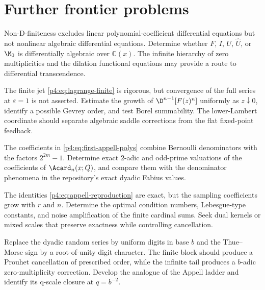 \documentclass[11pt]{article}
\numberwithin{equation}{section}
\theoremstyle{definition}
\theoremstyle{remark}
\newcommand{\C}{\mathbb C}
\begin{document}
\section{Further frontier problems}
\label{p4:sec:open}

\begin{frontieropenbox}[title=1. Differential transcendence]
Non-D-finiteness excludes linear polynomial-coefficient differential equations but not nonlinear algebraic differential equations.  Determine whether $F$, $I$, $U$, $\widehat U$, or $\M_0$ is differentially algebraic over $\C(x)$.  The infinite hierarchy of zero multiplicities and the dilation functional equations may provide a route to differential transcendence.
\end{frontieropenbox}

\begin{frontieropenbox}[title=2. Convergence and resurgence of the inverse Lagrange--Bell coupling series]
The finite jet \eqref{p4:eq:lagrange-finite} is rigorous, but convergence of the full series at $\varepsilon=1$ is not asserted.  Estimate the growth of
$\D^{n-1}[F(z)^n]$ uniformly as $z\downarrow0$, identify a possible Gevrey order, and test Borel summability.  The lower-Lambert coordinate should separate algebraic saddle corrections from the flat fixed-point feedback.
\end{frontieropenbox}

\begin{frontieropenbox}[title=3. Exact two-adic denominator laws for the cardinal Appell family]
The coefficients in \eqref{p4:eq:first-appell-polys} combine Bernoulli denominators with the factors $2^{2m}-1$.  Determine exact $2$-adic and odd-prime valuations of the coefficients of $\Acard_n(x;Q)$, and compare them with the denominator phenomena in the repository's exact dyadic Fabius values.
\end{frontieropenbox}

\begin{frontieropenbox}[title=4. Stability of coarsening reproduction]
The identities \eqref{p4:eq:appell-reproduction} are exact, but the sampling coefficients grow with $r$ and $n$.  Determine the optimal condition numbers, Lebesgue-type constants, and noise amplification of the finite cardinal sums.  Seek dual kernels or mixed scales that preserve exactness while controlling cancellation.
\end{frontieropenbox}

\begin{frontieropenbox}[title=5. Base-$b$ Prouhet kernels]
Replace the dyadic random series by uniform digits in base $b$ and the Thue--Morse sign by a root-of-unity digit character.  The finite block should produce a Prouhet cancellation of prescribed order, while the infinite tail produces a $b$-adic zero-multiplicity correction.  Develop the analogue of the Appell ladder and identify its q-scale closure at $q=b^{-2}$.
\end{frontieropenbox}
\end{document}
